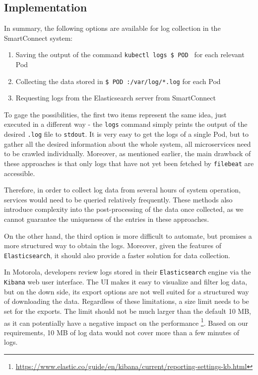 \subsection{Implementation}

In summary, the following options are available for log collection in the SmartConnect system:
\begin{enumerate}
\item Saving the output of the command \texttt{kubectl logs \${ POD }} for each relevant Pod 
\item Collecting the data stored in \texttt{\${ POD }:/var/log/*.log} for each Pod \item Requesting logs from the Elasticsearch server from SmartConnect
\end{enumerate}


To gage the possibilities, the first two items represent the same idea, just executed in a different way - the \texttt{logs} command simply prints the output of the desired \texttt{.log} file to \texttt{stdout}. 
It is very easy to get the logs of a single Pod, but to gather all the desired information about the whole system, all microservices need to be crawled individually. Moreover, as mentioned earlier, the main drawback of these approaches is that only logs that have not yet been fetched by \texttt{filebeat} are accessible.

Therefore, in order to collect log data from several hours of system operation, services would need to be queried relatively frequently. These methods also introduce complexity into the post-processing of the data once collected, as we cannot guarantee the uniqueness of the entries in these approaches.

On the other hand, the third option is more difficult to automate, but promises a more structured way to obtain the logs. Moreover, given the features of \texttt{Elasticsearch}, it should also provide a faster solution for data collection.

In Motorola, developers review logs stored in their \texttt{Elasticsearch} engine via the \texttt{Kibana} web user interface. The UI makes it easy to visualize and filter log data, but on the down side, its export options are not well suited for a structured way of downloading the data. Regardless of these limitations, a size limit needs to be set for the exports. The limit should not be much larger than the default 10 MB, as it can potentially have a negative impact on the performance \footnote{\url{https://www.elastic.co/guide/en/kibana/current/reporting-settings-kb.html}}. Based on our requirements, 10 MB of log data would not cover more than a few minutes of logs.

